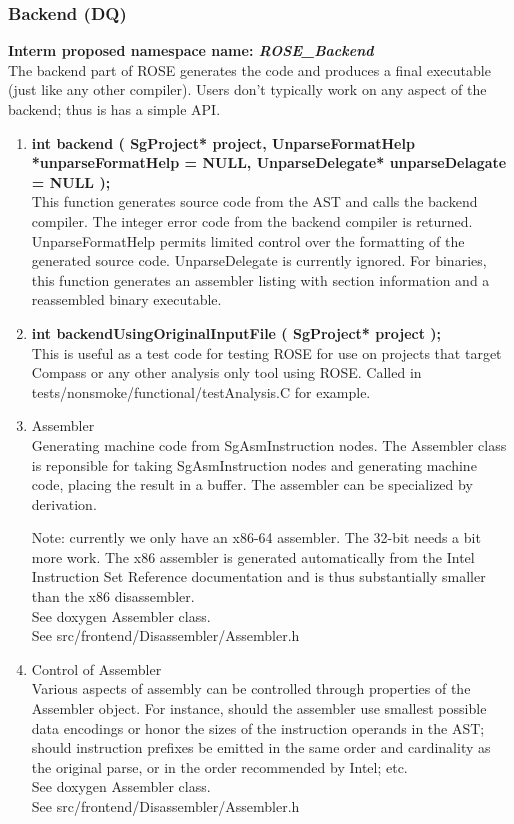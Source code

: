 \subsubsection{Backend (DQ)}
{\bf Interm proposed namespace name: {\em ROSE\_Backend}} \\
   The backend part of ROSE generates the code and produces a final executable
(just like any other compiler).  Users don't typically work on any aspect of 
the backend; thus is has a simple API.
\begin{enumerate}
   \item {\bf int backend ( SgProject* project, UnparseFormatHelp *unparseFormatHelp = NULL, UnparseDelegate* unparseDelagate = NULL );} \\
   This function generates source code from the AST and calls the backend
   compiler. The integer error code from the backend compiler is returned.
   UnparseFormatHelp permits limited control over the formatting of the 
   generated source code. UnparseDelegate is currently ignored. For binaries,
   this function generates an assembler listing with section information and
   a reassembled binary executable.

   \item {\bf int backendUsingOriginalInputFile ( SgProject* project );} \\
   This is useful as a test code for testing ROSE for use on projects that target Compass or any
   other analysis only tool using ROSE. Called in tests/nonsmoke/functional/testAnalysis.C for example.

   \item Assembler \\
   Generating machine code from SgAsmInstruction nodes. The
   Assembler class is reponsible for taking SgAsmInstruction
   nodes and generating machine code, placing the result in a
   buffer.  The assembler can be specialized by derivation.

   Note: currently we only have an x86-64 assembler. The 32-bit
   needs a bit more work.  The x86 assembler is generated
   automatically from the Intel Instruction Set Reference
   documentation and is thus substantially smaller than the x86
   disassembler. \\
   See doxygen Assembler class. \\
   See src/frontend/Disassembler/Assembler.h

   \item Control of Assembler \\
   Various aspects of assembly can be controlled through
   properties of the Assembler object.  For instance, should the
   assembler use smallest possible data encodings or honor the
   sizes of the instruction operands in the AST; should
   instruction prefixes be emitted in the same order and
   cardinality as the original parse, or in the order recommended
   by Intel; etc. \\
   See doxygen Assembler class. \\
   See src/frontend/Disassembler/Assembler.h

\end{enumerate}

